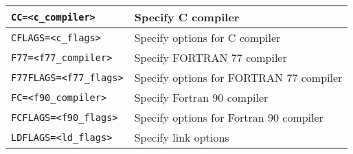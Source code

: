 \documentclass[a4paper]{article}
\begin{document}
\begin{table}[htbp]
\begin{center}
\begin{tabular}{|l|l|}
\verb+CC=<c_compiler>+   & Specify C compiler\\ \hline
\verb+CFLAGS=<c_flags>+    & Specify options for C compiler\\ \hline
\verb+F77=<f77_compiler>+    & Specify FORTRAN 77 compiler\\ \hline
\verb+F77FLAGS=<f77_flags>+    & Specify options for FORTRAN 77 compiler\\ \hline
\verb+FC=<f90_compiler>+    & Specify Fortran 90 compiler\\ \hline
\verb+FCFLAGS=<f90_flags>+    & Specify options for Fortran 90 compiler\\ \hline
\verb+LDFLAGS=<ld_flags>+    & Specify link options\\ \hline
\end{tabular}
\end{center}
\end{table}
\end{document}
